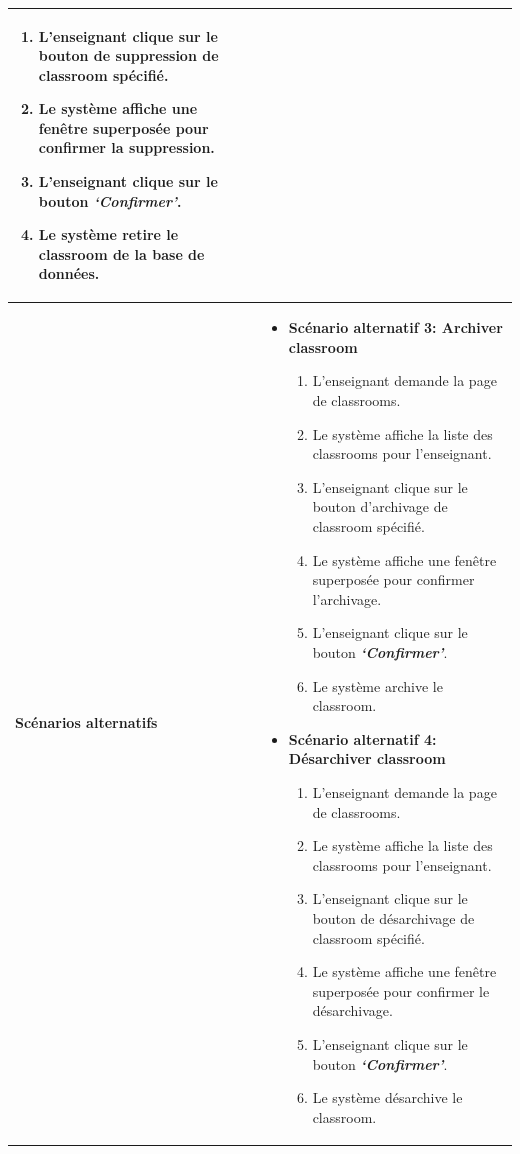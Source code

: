 \begin{itemize}[itemsep=1pt, parsep=1pt]
\begin{longtable}{|>{\RaggedRight\arraybackslash}p{4cm}|>{\RaggedRight\arraybackslash}p{12cm}|}
\begin{itemize}[label=]
\begin{enumerate}
                \item L’enseignant clique sur le bouton de suppression de classroom spécifié.
                \item Le système affiche une fenêtre superposée pour confirmer la suppression. 
                \item L’enseignant clique sur le bouton \textbf{\textit{‘Confirmer’}}.
                \item Le système retire le classroom de la base de données.
            \end{enumerate}
        \end{itemize} \\
        \hline
        \textbf{Scénarios alternatifs} & 
        \begin{itemize}[label=]
            \item \textbf{Scénario alternatif 3: Archiver classroom }
            \begin{enumerate}
                \item L’enseignant demande la page de classrooms.
                \item Le système affiche la liste des classrooms pour l’enseignant. 
                \item L’enseignant clique sur le bouton d’archivage de classroom spécifié.
                \item Le système affiche une fenêtre superposée pour confirmer l’archivage. 
                \item L’enseignant clique sur le bouton \textbf{\textit{‘Confirmer’}}.
                \item Le système archive le classroom.
            \end{enumerate}
            \item \textbf{Scénario alternatif 4: Désarchiver classroom }
            \begin{enumerate}
                \item L’enseignant demande la page de classrooms.
                \item Le système affiche la liste des classrooms pour l’enseignant. 
                \item L’enseignant clique sur le bouton de désarchivage de classroom spécifié.
                \item Le système affiche une fenêtre superposée pour confirmer le désarchivage.
                \item L’enseignant clique sur le bouton \textbf{\textit{‘Confirmer’}}.
                \item Le système désarchive le classroom.

\end{enumerate}
\end{itemize}
\end{longtable}
\end{itemize}
